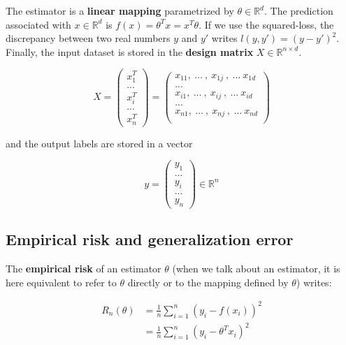 \documentclass[
10pt, %
a4paper, %
oneside, %
headinclude,footinclude, %
BCOR5mm, %
]{scrartcl}
\begin{document}
The estimator is a \textbf{{linear mapping}} parametrized by $ \theta\in
\mathbb{R}^d$. The prediction associated with $x\in \mathbb{R}^d$ is $f(x)=
\theta^Tx = x^T\theta$. If we use the squared-loss, the discrepancy between two real numbers $y$ and $y'$ writes $l(y,y')=(y-y')^2$. Finally, the input dataset is stored in the \textbf{{design matrix}} $X\in \mathbb{R}^{n\times d}$.

\begin{equation}
X=
\begin{pmatrix}
x_{1}^T\\
...\\
x_{i}^T\\
...\\
x_{n}^T
\end{pmatrix}
=
\begin{pmatrix}
    x_{11}, \:\dots\:,\: x_{1j}\:, \:\dots\: x_{1d}\\
...\\
    x_{i1}, \:\dots\:,\: x_{ij}\:, \:\dots\: x_{id}\\
...\\
    x_{n1}, \:\dots\:,\: x_{nj}\:, \:\dots\: x_{nd}\\
\end{pmatrix}
\end{equation}

and the output labels are stored in a vector

\begin{equation}
    y=
\begin{pmatrix}
y_{1}\\
...\\
y_{i}\\
...\\
y_{n}
\end{pmatrix}\in \mathbb{R}^n
\end{equation}


\subsection{Empirical risk and generalization error}

The \textbf{empirical risk} of an estimator $\theta$ (when we talk about an estimator, it is here equivalent to refer to $\theta$ directly or to the mapping defined by $\theta$) writes:


\begin{equation}
    \begin{aligned}
	R_n(\theta) &= \frac{1}{n} \sum^{n}_{i=1} (y_i-f(x_i))^2\\
		    &= \frac{1}{n} \sum^{n}_{i=1} (y_i-\theta^Tx_i)^2\\
    \end{aligned}
\end{equation}
\end{document}
